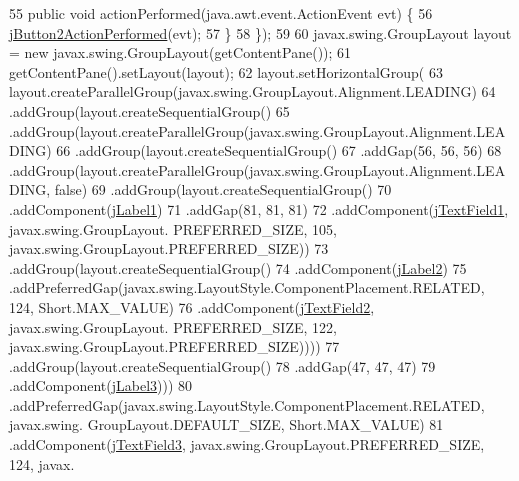 \begin{DoxyCode}
55             \textcolor{keyword}{public} \textcolor{keywordtype}{void} actionPerformed(java.awt.event.ActionEvent evt) \{
56                 \mbox{\hyperlink{class_interfaz_package_1_1_busqueda_facturas_a2f1ef5a0573d3c0079b0c2ec4c1425f9}{jButton2ActionPerformed}}(evt);
57             \}
58         \});
59 
60         javax.swing.GroupLayout layout = \textcolor{keyword}{new} javax.swing.GroupLayout(getContentPane());
61         getContentPane().setLayout(layout);
62         layout.setHorizontalGroup(
63             layout.createParallelGroup(javax.swing.GroupLayout.Alignment.LEADING)
64             .addGroup(layout.createSequentialGroup()
65                 .addGroup(layout.createParallelGroup(javax.swing.GroupLayout.Alignment.LEADING)
66                     .addGroup(layout.createSequentialGroup()
67                         .addGap(56, 56, 56)
68                         .addGroup(layout.createParallelGroup(javax.swing.GroupLayout.Alignment.LEADING, \textcolor{keyword}{
      false})
69                             .addGroup(layout.createSequentialGroup()
70                                 .addComponent(\mbox{\hyperlink{class_interfaz_package_1_1_busqueda_facturas_a3cb5b1df90ba3c664ab24c9ddc288a2e}{jLabel1}})
71                                 .addGap(81, 81, 81)
72                                 .addComponent(\mbox{\hyperlink{class_interfaz_package_1_1_busqueda_facturas_ac7cfc9bbf0501c53bb3014890e92efc2}{jTextField1}}, javax.swing.GroupLayout.
      PREFERRED\_SIZE, 105, javax.swing.GroupLayout.PREFERRED\_SIZE))
73                             .addGroup(layout.createSequentialGroup()
74                                 .addComponent(\mbox{\hyperlink{class_interfaz_package_1_1_busqueda_facturas_ad742b0bf64188b05a8296fd972b67b47}{jLabel2}})
75                                 .addPreferredGap(javax.swing.LayoutStyle.ComponentPlacement.RELATED, 124, 
      Short.MAX\_VALUE)
76                                 .addComponent(\mbox{\hyperlink{class_interfaz_package_1_1_busqueda_facturas_a3bc720241bb5aea5badbbc7937d79292}{jTextField2}}, javax.swing.GroupLayout.
      PREFERRED\_SIZE, 122, javax.swing.GroupLayout.PREFERRED\_SIZE))))
77                     .addGroup(layout.createSequentialGroup()
78                         .addGap(47, 47, 47)
79                         .addComponent(\mbox{\hyperlink{class_interfaz_package_1_1_busqueda_facturas_a92d227beb642242b3952cdd159970c32}{jLabel3}})))
80                 .addPreferredGap(javax.swing.LayoutStyle.ComponentPlacement.RELATED, javax.swing.
      GroupLayout.DEFAULT\_SIZE, Short.MAX\_VALUE)
81                 .addComponent(\mbox{\hyperlink{class_interfaz_package_1_1_busqueda_facturas_aadd306dde44841b9ab43c6753b3df0d7}{jTextField3}}, javax.swing.GroupLayout.PREFERRED\_SIZE, 124, javax.

\end{DoxyCode}
